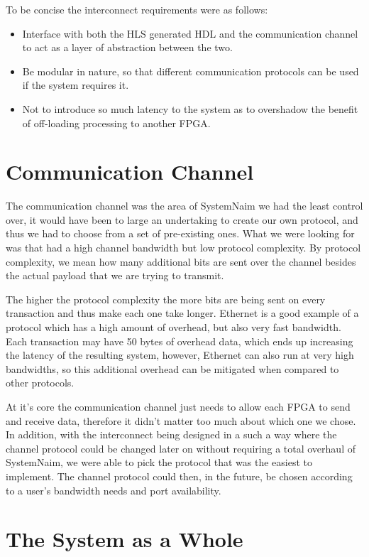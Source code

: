 To be concise the interconnect requirements were as follows:

\begin{itemize}
    \item Interface with both the HLS generated HDL and the communication channel to act as a layer of abstraction between the two.
    \item Be modular in nature, so that different communication protocols can be used if the system requires it.
    \item Not to introduce so much latency to the system as to overshadow the benefit of off-loading processing to another FPGA.
\end{itemize}

\section{Communication Channel}

The communication channel was the area of SystemNaim we had the least control over, it would have been to large an undertaking to create our own protocol, and thus we had to choose from a set of pre-existing ones. What we were looking for was that had a high channel bandwidth but low protocol complexity. By protocol complexity, we mean how many additional bits are sent over the channel besides the actual payload that we are trying to transmit.

The higher the protocol complexity the more bits are being sent on every transaction and thus make each one take longer. Ethernet is a good example of a protocol which has a high amount of overhead, but also very fast bandwidth. Each transaction may have 50 bytes of overhead data, which ends up increasing the latency of the resulting system, however, Ethernet can also run at very high bandwidths, so this additional overhead can be mitigated when compared to other protocols.

At it's core the communication channel just needs to allow each FPGA to send and receive data, therefore it didn't matter too much about which one we chose. In addition, with the interconnect being designed in a such a way where the channel protocol could be changed later on without requiring a total overhaul of SystemNaim, we were able to pick the protocol that was the easiest to implement. The channel protocol could then, in the future, be chosen according to a user's bandwidth needs and port availability.

\section{The System as a Whole}
\label{sec:full_system}

